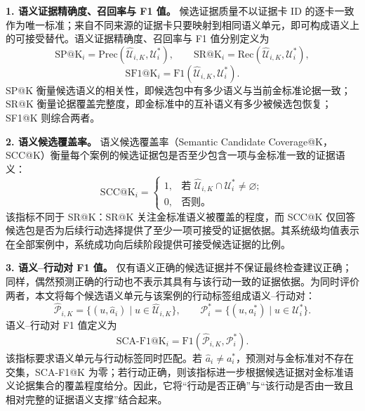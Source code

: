 \textbf{1. 语义证据精确度、召回率与 F1 值。}
候选证据质量不以证据卡 ID 的逐卡一致作为唯一标准；来自不同来源的证据卡只要映射到相同语义单元，即可构成语义上的可接受替代。语义证据精确度、召回率与 F1 值分别定义为
\begin{equation}
\mathrm{SP@K}_i=\mathrm{Prec}(\hat{\mathcal{U}}_{i,K},\mathcal{U}^{*}_i),
\qquad
\mathrm{SR@K}_i=\mathrm{Rec}(\hat{\mathcal{U}}_{i,K},\mathcal{U}^{*}_i),
\label{eq:semantic-precision-recall}
\end{equation}
\begin{equation}
\mathrm{SF1@K}_i=\mathrm{F1}(\hat{\mathcal{U}}_{i,K},\mathcal{U}^{*}_i).
\label{eq:semantic-f1}
\end{equation}
SP@K 衡量候选语义的相关性，即候选包中有多少语义与当前金标准论据一致；SR@K 衡量论据覆盖完整度，即金标准中的互补语义有多少被候选包恢复；SF1@K 则综合两者。

\textbf{2. 语义候选覆盖率。}
语义候选覆盖率（Semantic Candidate Coverage@K，SCC@K）衡量每个案例的候选证据包是否至少包含一项与金标准一致的证据语义：
\begin{equation}
\mathrm{SCC@K}_i=
\begin{cases}
1, & \text{若 } \hat{\mathcal{U}}_{i,K}\cap\mathcal{U}^{*}_i\neq\varnothing;\\
0, & \text{否则。}
\end{cases}
\label{eq:semantic-coverage}
\end{equation}
该指标不同于 SR@K：SR@K 关注金标准语义被覆盖的程度，而 SCC@K 仅回答候选包是否为后续行动选择提供了至少一项可接受的证据依据。其系统级均值表示在全部案例中，系统成功向后续阶段提供可接受候选证据的比例。

\textbf{3. 语义--行动对 F1 值。}
仅有语义正确的候选证据并不保证最终检查建议正确；同样，偶然预测正确的行动也不表示其具有与该行动一致的证据依据。为同时评价两者，本文将每个候选语义单元与该案例的行动标签组成语义--行动对：
\begin{equation}
\hat{\mathcal{P}}_{i,K}=
\{(u,\hat{a}_i)\mid u\in\hat{\mathcal{U}}_{i,K}\},
\qquad
\mathcal{P}^{*}_i=
\{(u,a^{*}_i)\mid u\in\mathcal{U}^{*}_i\}.
\label{eq:semantic-action-pairs}
\end{equation}
语义--行动对 F1 值定义为
\begin{equation}
\mathrm{SCA\mbox{-}F1@K}_i=
\mathrm{F1}(\hat{\mathcal{P}}_{i,K},\mathcal{P}^{*}_i).
\label{eq:semantic-action-pair-f1}
\end{equation}
该指标要求语义单元与行动标签同时匹配。若 \(\hat{a}_i\neq a_i^{*}\)，预测对与金标准对不存在交集，SCA-F1@K 为零；若行动正确，则该指标进一步根据候选证据对金标准语义论据集合的覆盖程度给分。因此，它将“行动是否正确”与“该行动是否由一致且相对完整的证据语义支撑”结合起来。

